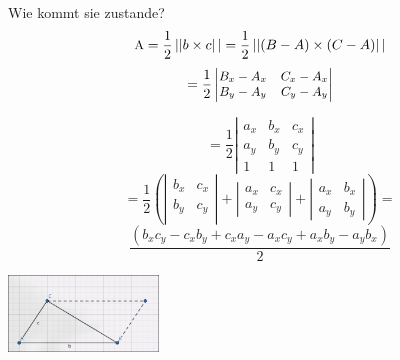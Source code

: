 \documentclass{beamer}
\begin{document}
\begin{frame}
	\frametitle{\phantom{}}
	\begin{minipage}{0.6\textwidth}
		\vspace{5mm}
		\small
		Wie kommt sie zustande? \\
		\[
		\small
		\text{A} = \frac{1}{2} \left||b \times c \right|| = \frac{1}{2} \left||(B - A) \times (C - A) \right|| 
		\]
		\[
		\small =
		\frac{1}{2}
		\left| 
		\begin{matrix} 
			B_{x} - A_{x} & C_{x} - A_{x} \\
			B_{y} - A_{y} & C_{y} - A_{y}\\ 
		\end{matrix}
		\right|
		\]
		
		\[  =\frac{1}{2}
		\left| 
		\begin{matrix} 
			a_{x} & b_{x} & c_{x} \\
			a_{y} & b_{y} & c_{y} \\
			1 & 1 & 1 
		\end{matrix}
		\right|
		\]
		\[ =
		\frac{1}{2} \left( \left| 
		\begin{matrix} 
			b_{x} & c_{x} \\
			b_{y} & c_{y} \\
		\end{matrix}
		\right| 
		+
		\left| \begin{matrix}
			a_{x} & c_{x} \\
			a_{y} & c_{y}
		\end{matrix} \right|
		+
		\left| 
		\begin{matrix}
			a_{x} & b_{x} \\
			a_{y} & b_{y}
		\end{matrix}
		\right| \right) =
		\]
		\vspace{3mm}
		\[
		\frac{(b_{x}c_{y} - c_{x}b_{y}  + c_{x}a_{y} - a_{x}c_{y} + a_{x}b_{y} - a_{y}b_{x})}{2}
		\]
	\end{minipage}%
	\hfill
	\begin{minipage}{0.3\textwidth}
		\hspace{-10mm}
		\centering
		\includegraphics[width=4cm]{bilder/geo.png}
	\end{minipage}
\end{frame}
\end{document}
